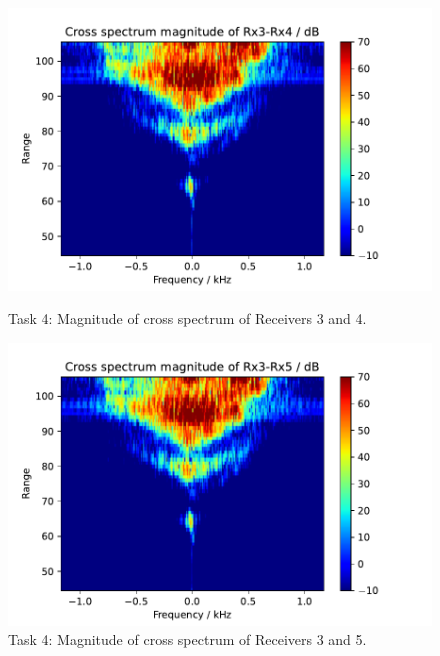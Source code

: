 \begin{figure}[H]
    \centering
    \begin{minipage}{0.48\textwidth}
        \centering
        \includegraphics[width=\textwidth]{graphics/t4/t4-mag-3-4.pdf}
    \caption{Task 4: Magnitude of cross spectrum of Receivers 3 and 4.}
    \label{fig:t4-mag-3-4}
    \end{minipage}\hfill
    \begin{minipage}{0.48\textwidth}
        \centering
             \includegraphics[width=\textwidth]{graphics/t4/t4-mag-3-5.pdf}
    \caption{Task 4: Magnitude of cross spectrum of Receivers 3 and 5.}
    \label{fig:t4-mag-3-5}
    \end{minipage}
\end{figure}

